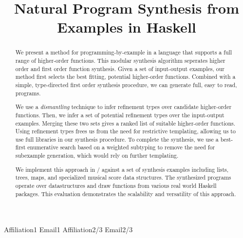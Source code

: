 \documentclass[preprint]{sigplanconf}
\begin{document}
\setlength{\pdfpageheight}{\paperheight}
\setlength{\pdfpagewidth}{\paperwidth}




\title{Natural Program Synthesis from Examples in Haskell}

           {Affiliation1}
           {Email1}
           {Affiliation2/3}
           {Email2/3}

\maketitle

\begin{abstract}
  We present a method for programming-by-example in a language that supports a full range of higher-order functions.
  This modular synthesis algorithm seperates higher order and first order function synthesis.
  Given a set of input-output examples, our method first selects the best fitting, potential higher-order functions.
  Combined with a simple, type-directed first order synthesis procedure, we can generate full, easy to read, programs.

  We use a \textit{dismantling} technique to infer refinement types over candidate higher-order functions.
  Then, we infer a set of potential refinement types over the input-output examples.
  Merging these two sets gives a ranked list of suitable higher-order functions.
  Using refinement types frees us from the need for restrictive templating, allowing us to use full libraries in our synthesis procedure.
  To complete the synthesis, we use a best-first enumerative search based on a weighted subtyping to remove the need for subexample generation, which would rely on further templating.

  We implement this approach in \ourTool/ against a set of synthesis examples including lists, trees, maps, and specialized musical score data structures.
  The synthesized programs operate over datastructures and draw functions from various real world Haskell packages.
  This evaluation demonstrates the scalability and versatility of this approach.
\end{abstract}
\end{document}
